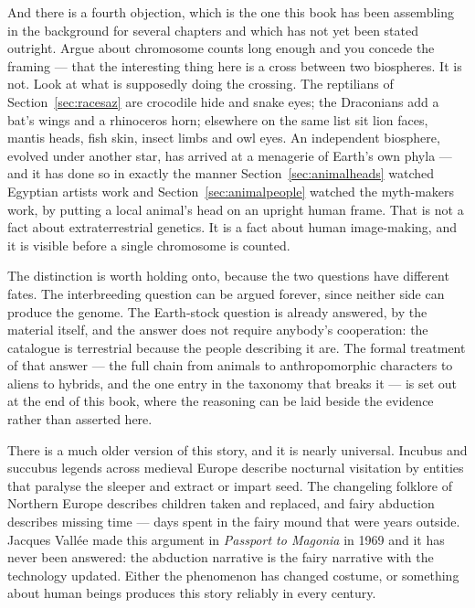 And there is a fourth objection, which is the one this book has been assembling in the background
for several chapters and which has not yet been stated outright. Argue about chromosome counts
long enough and you concede the framing --- that the interesting thing here is a cross between two
biospheres. It is not. Look at what is supposedly doing the crossing. The reptilians of
Section~\ref{sec:racesaz} are crocodile hide and snake eyes; the Draconians add a bat's wings and
a rhinoceros horn; elsewhere on the same list sit lion faces, mantis heads, fish skin, insect
limbs and owl eyes.  An
independent biosphere, evolved under another star, has arrived at a menagerie of Earth's own
phyla --- and it has done so in exactly the manner Section~\ref{sec:animalheads} watched Egyptian
artists work and Section~\ref{sec:animalpeople} watched the myth-makers work, by putting a local
animal's head on an upright human frame. That is not a fact about extraterrestrial genetics. It is
a fact about human image-making, and it is visible before a single chromosome is counted.


The distinction is worth holding onto, because the two questions have different fates. The
interbreeding question can be argued forever, since neither side can produce the genome. The
Earth-stock question is already answered, by the material itself, and the answer does not require
anybody's cooperation: the catalogue is terrestrial because the people describing it are. The
formal treatment of that answer --- the full chain from animals to anthropomorphic characters to
aliens to hybrids, and the one entry in the taxonomy that breaks it --- is set out at the end of
this book, where the reasoning can be laid beside the evidence rather than asserted here.

\begin{funfact}
There is a much older version of this story, and it is nearly universal. Incubus and succubus
legends across medieval Europe describe nocturnal visitation by entities that paralyse the
sleeper and extract or impart seed. The changeling folklore of Northern Europe describes
children taken and replaced, and fairy abduction describes missing time --- days spent in the
fairy mound that were years outside. Jacques Vall\'ee made this argument in
\emph{Passport to Magonia} in 1969 and it has never been answered: the abduction narrative is
the fairy narrative with the technology updated. Either the phenomenon has changed costume, or
something about human beings produces this story reliably in every century.
\end{funfact}

